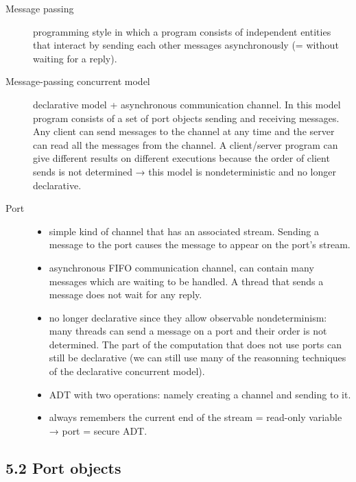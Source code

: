 \begin{description}
  \item[Message passing] programming style in which a program consists of independent entities that interact by sending each other messages asynchronously (= without waiting for a reply).

  \item[Message-passing concurrent model] declarative model + asynchronous communication channel.
    In this model program consists of a set of port objects sending and receiving messages.
    Any client can send messages to the channel at any time and the server can read all the messages from the channel.
    A client/server program can give different results on different executions because the order of client sends is not determined → this model is nondeterministic and no longer declarative.

  \item[Port]
    \begin{itemize}
      \item simple kind of channel that has an associated stream.
        Sending a message to the port causes the message to appear on the port's stream.
      \item asynchronous FIFO communication channel, can contain many messages which are waiting to be handled.
        A thread that sends a message does not wait for any reply.
      \item no longer declarative since they allow observable nondeterminism: many threads can send a message on a port and their order is not determined.
        The part of the computation that does not use ports can still be declarative (we can still use many of the reasonning techniques of the declarative concurrent model).
      \item ADT with two operations: namely creating a channel and sending to it.
      \item always remembers the current end of the stream = read-only variable → port = secure ADT.

    \end{itemize}
\end{description}

\subsection{5.2 Port objects}

